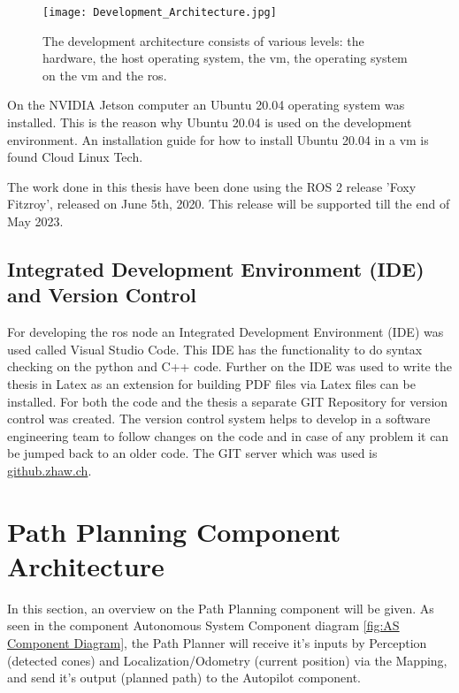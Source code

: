 \begin{figure}[H]
    \centering
    \texttt{[image: Development\_Architecture.jpg]}
    \caption{The development architecture consists of various levels: the hardware, the host operating system, the \acrlong{vm}, the operating system on the \acrshort{vm} and the \acrlong{ros}.}
    \label{fig:Development Architecture}
\end{figure}

On the NVIDIA Jetson computer an Ubuntu 20.04 operating system was installed. This is the reason why Ubuntu 20.04 is used on the development environment. An installation guide for how to install Ubuntu 20.04 in a \acrlong{vm} is found Cloud Linux Tech. \cite{cloudlinuxtech_install_ubuntu_2004}

The work done in this thesis have been done using the ROS 2 release 'Foxy Fitzroy', released on June 5th, 2020. This release will be supported till the end of May 2023. \cite{ros2_releases_and_target_platforms}

\subsection{Integrated Development Environment (IDE) and Version Control} \label{sec:Integrated Development Environment (IDE) and Version Control}
For developing the \acrshort{ros} node an Integrated Development Environment (IDE) was used called Visual Studio Code. This IDE has the functionality to do syntax checking on the python and C++ code. Further on the IDE was used to write the thesis in Latex as an extension for building PDF files via Latex files can be installed. For both the code and the thesis a separate GIT Repository for version control was created. The version control system helps to develop in a software engineering team to follow changes on the code and in case of any problem it can be jumped back to an older code. The GIT server which was used is \href{https://github.zhaw.ch}{github.zhaw.ch}.

\section{Path Planning Component Architecture} \label{sec:Path Planning Component Architecture}
In this section, an overview on the Path Planning component will be given. As seen in the component Autonomous System Component diagram \ref{fig:AS Component Diagram}, the Path Planner will receive it's inputs by Perception (detected cones) and Localization/Odometry (current position) via the Mapping, and send it's output (planned path) to the Autopilot component.

